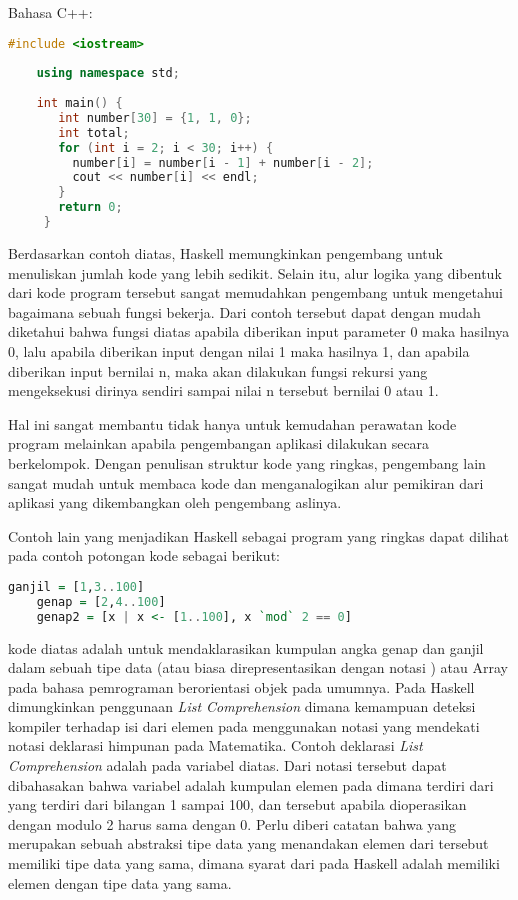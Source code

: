 \documentclass[pi.tex]{subfile}
\begin{document}
  Bahasa C++:
  \begin{lstlisting}[language=C++]
    #include <iostream>  
  
    using namespace std;  
  
    int main() {  
       int number[30] = {1, 1, 0};  
       int total;  
       for (int i = 2; i < 30; i++) {  
         number[i] = number[i - 1] + number[i - 2];  
         cout << number[i] << endl;  
       }  
       return 0;  
     }  
  \end{lstlisting}

  Berdasarkan contoh diatas, Haskell memungkinkan pengembang untuk menuliskan jumlah kode yang lebih sedikit. Selain itu, alur logika yang dibentuk dari kode program tersebut sangat memudahkan pengembang untuk mengetahui bagaimana sebuah fungsi bekerja. Dari contoh tersebut dapat dengan mudah diketahui bahwa fungsi  diatas apabila diberikan input parameter 0 maka hasilnya 0, lalu apabila diberikan input dengan nilai 1 maka hasilnya 1, dan apabila diberikan input bernilai n, maka akan dilakukan fungsi rekursi yang mengeksekusi dirinya sendiri sampai nilai n tersebut bernilai 0 atau 1.

  Hal ini sangat membantu tidak hanya untuk kemudahan perawatan kode program melainkan apabila pengembangan aplikasi dilakukan secara berkelompok. Dengan penulisan struktur kode yang ringkas, pengembang lain sangat mudah untuk membaca kode dan menganalogikan alur pemikiran dari aplikasi yang dikembangkan oleh pengembang aslinya.

  Contoh lain yang menjadikan Haskell sebagai program yang ringkas dapat dilihat pada contoh potongan kode sebagai berikut:\\
  \begin{lstlisting}[language=Haskell]
    ganjil = [1,3..100]
    genap = [2,4..100]
    genap2 = [x | x <- [1..100], x `mod` 2 == 0]
  \end{lstlisting}
  kode diatas adalah untuk mendaklarasikan kumpulan angka genap dan ganjil dalam sebuah tipe data  (atau biasa direpresentasikan dengan notasi \fhaskell{[ ]}) atau Array pada bahasa pemrograman berorientasi objek pada umumnya. Pada Haskell dimungkinkan penggunaan \emph{List Comprehension} dimana kemampuan deteksi kompiler terhadap isi dari elemen pada  menggunakan notasi yang mendekati notasi deklarasi himpunan pada Matematika. Contoh deklarasi \emph{List Comprehension} adalah pada variabel  diatas. Dari notasi tersebut dapat dibahasakan bahwa variabel  adalah kumpulan elemen pada  dimana terdiri dari  yang terdiri dari bilangan 1 sampai 100, dan  tersebut apabila dioperasikan dengan modulo 2 harus sama dengan 0. Perlu diberi catatan bahwa  yang merupakan sebuah abstraksi tipe data yang menandakan elemen dari  tersebut memiliki tipe data yang sama, dimana syarat dari  pada Haskell adalah memiliki elemen dengan tipe data yang sama.
\end{document}
